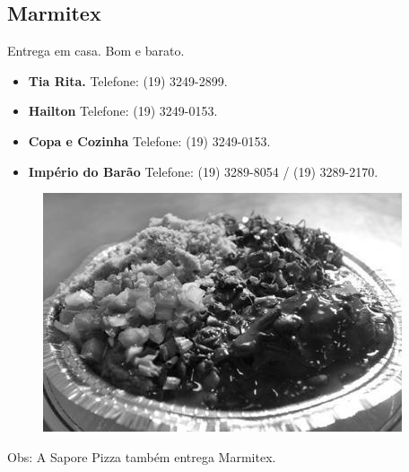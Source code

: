\subsection{Marmitex}

Entrega em casa. Bom e barato.

\begin{itemize}
\item   \textbf{Tia Rita.}
		Telefone: (19) 3249-2899.

\item   \textbf{Hailton}
		Telefone: (19) 3249-0153.

\item   \textbf{Copa e Cozinha}
		Telefone: (19) 3249-0153.

\item   \textbf{Império do Barão}
		Telefone: (19) 3289-8054 / (19) 3289-2170.
\end{itemize}

\begin{figure}[t!]
    \centering
    \includegraphics[scale=0.55,keepaspectratio=true]{img/imgs/6-comida/marmitex.jpg}
\end{figure}

Obs: A Sapore Pizza também entrega Marmitex.

